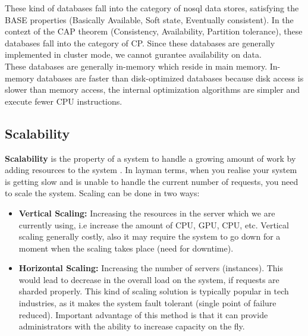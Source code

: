 \documentclass[11pt]{article}
\begin{document}
These kind of databases fall into the category of nosql data stores, satisfying the 
BASE properties (Basically Available, Soft state, Eventually consistent).
In the contezt of the CAP theorem (Consistency, Availability, Partition tolerance), these
databases fall into the category of CP. Since these databases are generally implemented
in cluster mode, we cannot gurantee availability on data.
\\

These databases are generally in-memory which reside in main memory. In-memory
databases are faster than disk-optimized databases because disk access is 
slower than memory access, the internal optimization algorithms 
are simpler and execute fewer CPU instructions.

\subsection*{Scalability}
\textbf{Scalability} is the property of a system to handle a growing amount of work
by adding resources to the system \cite{scaling}. In layman terms, when
you realise your system is getting slow and is unable to handle
the current number of requests, you need to scale the system. Scaling 
can be done in two ways:

\begin{itemize}
    \item \textbf{Vertical Scaling:} Increasing the resources in the server
            which we are currently using, i.e increase the amount of CPU, GPU,
            CPU, etc. Vertical scaling generally costly, also it may
            require the system to go down for a moment when the scaling takes
            place (need for downtime).
    \item \textbf{Horizontal Scaling:} Increasing the number of servers (instances).
            This would lead to decrease in the overall load on the system, if requests
            are sharded properly. This kind of scaling solution is typically popular 
            in tech industries, as it makes the system fault tolerant (single point of
            failure reduced). Important advantage of this method is that it can provide
            administrators with the ability to increase capacity on the fly.
\end{itemize}
\end{document}
